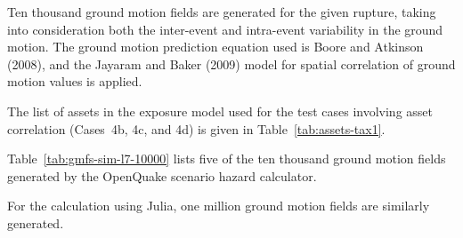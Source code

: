 Ten thousand ground motion fields are generated for the given rupture, taking into consideration both the inter-event and intra-event variability in the ground motion. The ground motion prediction equation used is Boore and Atkinson (2008), and the Jayaram and Baker (2009) model for spatial correlation of ground motion values is applied.



The list of assets in the exposure model used for the test cases involving asset correlation (Cases~4b, 4c, and 4d) is given in Table~\ref{tab:assets-tax1}.



Table~\ref{tab:gmfs-sim-l7-10000} lists five of the ten thousand ground motion fields generated by the OpenQuake scenario hazard calculator.

For the calculation using Julia, one million ground motion fields are similarly generated.